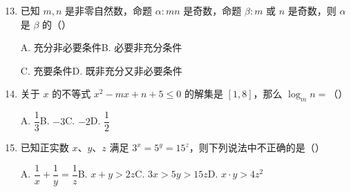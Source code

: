 \documentclass[a4paper,11pt]{article}
\begin{document}
\begin{enumerate}
\setcounter{enumi}{12}

\item 已知 $m,n$ 是非零自然数，命题 $\alpha:mn$ 是奇数，命题 $\beta:m$ 或 $n$ 是奇数，则 $\alpha$ 是 $\beta$ 的\mbox{（\quad）}

\keepwithprev
A. 充分非必要条件\qquad\qquad B. 必要非充分条件

C. 充要条件\qquad\qquad D. 既非充分又非必要条件

\ifanswer
\solbegin
{}
\solend
\fi

\item 关于 $x$ 的不等式 $x^2-mx+n+5\leq0$ 的解集是 $[1,8]$，那么 $\log_m n=$\mbox{（\quad）}

\keepwithprev
A. $\dfrac13$\qquad\qquad B. $-3$\qquad\qquad C. $-2$\qquad\qquad D. $\dfrac12$

\ifanswer
\solbegin
{}
\solend
\fi

\item 已知正实数 $x$、$y$、$z$ 满足 $3^x=5^y=15^z$，则下列说法中不正确的是\mbox{（\quad）}

\keepwithprev
A. $\dfrac1x+\dfrac1y=\dfrac1z$\qquad\qquad B. $x+y>2z$\qquad\qquad C. $3x>5y>15z$\qquad\qquad D. $x\cdot y>4z^2$


\end{enumerate}
\end{document}
